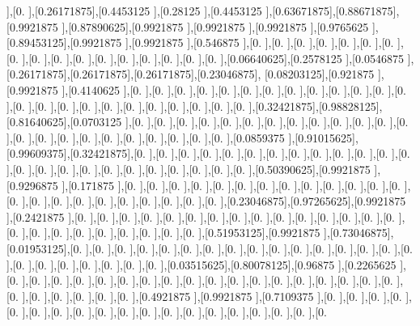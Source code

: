 \documentclass[titlepage]{article}
\begin{document}
    ],[0.        ],[0.26171875],[0.4453125 ],[0.28125   ],[0.4453125 ],[0.63671875],[0.88671875],[0.9921875 ],[0.87890625],[0.9921875 ],[0.9921875 ],[0.9921875 ],[0.9765625 ],[0.89453125],[0.9921875 ],[0.9921875 ],[0.546875  ],[0.        ],[0.        ],[0.        ],[0.        ],[0.        ],[0.        ],[0.        ],[0.        ],[0.        ],[0.        ],[0.        ],[0.        ],[0.        ],[0.        ],[0.        ],[0.        ],[0.        ],[0.06640625],[0.2578125 ],[0.0546875 ],[0.26171875],[0.26171875],[0.26171875],[0.23046875], [0.08203125],[0.921875  ],[0.9921875 ],[0.4140625 ],[0.        ],[0.        ],[0.        ],[0.        ],[0.        ],[0.        ],[0.        ],[0.        ],[0.        ],[0.        ],[0.        ],[0.        ],[0.        ],[0.        ],[0.        ],[0.        ],[0.        ],[0.        ],[0.        ],[0.        ],[0.        ],[0.        ],[0.        ],[0.        ],[0.32421875],[0.98828125],[0.81640625],[0.0703125 ],[0.        ],[0.        ],[0.        ],[0.        ],[0.        ],[0.        ],[0.        ],[0.        ],[0.        ],[0.        ],[0.        ],[0.        ],[0.        ],[0.        ],[0.        ],[0.        ],[0.        ],[0.        ],[0.        ],[0.        ],[0.        ],[0.        ],[0.        ],[0.0859375 ],[0.91015625],[0.99609375],[0.32421875],[0.        ],[0.        ],[0.        ],[0.        ],[0.        ],[0.        ],[0.        ],[0.        ],[0.        ],[0.        ],[0.        ],[0.        ],[0.        ],[0.        ],[0.        ],[0.        ],[0.        ],[0.        ],[0.        ],[0.        ],[0.        ],[0.        ],[0.        ],[0.        ],[0.50390625],[0.9921875 ],[0.9296875 ],[0.171875  ],[0.        ],[0.        ],[0.        ],[0.        ],[0.        ],[0.        ],[0.        ],[0.        ],[0.        ],[0.        ],[0.        ],[0.        ],[0.        ],[0.        ],[0.        ],[0.        ],[0.        ],[0.        ],[0.        ],[0.        ],[0.        ],[0.        ],[0.        ],[0.23046875],[0.97265625],[0.9921875 ],[0.2421875 ],[0.        ],[0.        ],[0.        ],[0.        ],[0.        ],[0.        ],[0.        ],[0.        ],[0.        ],[0.        ],[0.        ],[0.        ],[0.        ],[0.        ],[0.        ],[0.        ],[0.        ],[0.        ],[0.        ],[0.        ],[0.        ],[0.        ],[0.        ],[0.        ],[0.51953125],[0.9921875 ],[0.73046875],[0.01953125],[0.        ],[0.        ],[0.        ],[0.        ],[0.        ],[0.        ],[0.        ],[0.        ],[0.        ],[0.        ],[0.        ],[0.        ],[0.        ],[0.        ],[0.        ],[0.        ],[0.        ],[0.        ],[0.        ],[0.        ],[0.        ],[0.        ],[0.        ],[0.03515625],[0.80078125],[0.96875   ],[0.2265625 ],[0.        ],[0.        ],[0.        ],[0.        ],[0.        ],[0.        ],[0.        ],[0.        ],[0.        ],[0.        ],[0.        ],[0.        ],[0.        ],[0.        ],[0.        ],[0.        ],[0.        ],[0.        ],[0.        ],[0.        ],[0.        ],[0.        ],[0.        ],[0.        ],[0.4921875 ],[0.9921875 ],[0.7109375 ],[0.        ],[0.        ],[0.        ],[0.        ],[0.        ],[0.        ],[0.        ],[0.        ],[0.        ],[0.        ],[0.        ],[0.        ],[0.        ],[0.        ],[0.        ],[0.        ],[0.        ],[0.        ],[0.        
\end{document}

